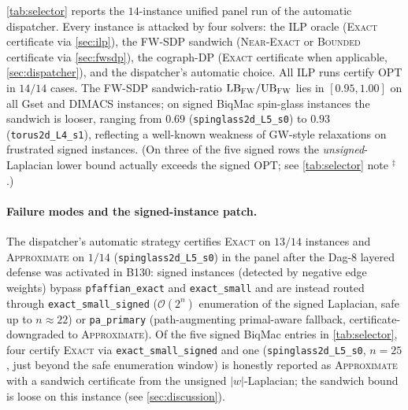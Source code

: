\documentclass{article}
\theoremstyle{definition}
\theoremstyle{remark}
\newcommand{\ILP}{\textsc{ILP}\xspace}
\newcommand{\FW}{\textsc{FW}\xspace}
\newcommand{\SDP}{\textsc{SDP}\xspace}
\newcommand{\GW}{\textsc{GW}\xspace}
\newcommand{\OPT}{\mathrm{OPT}}
\newcommand{\LB}{\mathrm{LB}}
\newcommand{\UB}{\mathrm{UB}}
\newcommand{\Oh}{\mathcal{O}}
\begin{document}
\cref{tab:selector} reports the $14$-instance unified panel run of the
automatic dispatcher. Every instance is attacked by four solvers: the
\ILP oracle (\textsc{Exact} certificate via
\cref{sec:ilp}), the FW-\SDP sandwich (\textsc{Near-Exact} or
\textsc{Bounded} certificate via \cref{sec:fwsdp}), the cograph-DP
(\textsc{Exact} certificate when applicable, \cref{sec:dispatcher}),
and the dispatcher's automatic choice. All \ILP runs certify $\OPT$ in
$14/14$ cases. The FW-\SDP sandwich-ratio $\LB_{\FW} / \UB_{\FW}$ lies in $[0.95, 1.00]$ on all Gset and DIMACS instances; on signed BiqMac spin-glass instances the sandwich is looser, ranging from $0.69$ (\texttt{spinglass2d\_L5\_s0}) to $0.93$ (\texttt{torus2d\_L4\_s1}), reflecting a well-known weakness of \GW-style relaxations on frustrated signed instances. (On three of the five signed rows the \emph{unsigned}-Laplacian lower bound actually exceeds the signed $\OPT$; see \cref{tab:selector} note $^\ddagger$.)

\paragraph{Failure modes and the signed-instance patch.} The dispatcher's
automatic strategy certifies \textsc{Exact} on $13/14$ instances and \textsc{Approximate} on $1/14$ (\texttt{spinglass2d\_L5\_s0}) in the panel
after the Dag-8 layered defense was activated in B130: signed instances
(detected by negative edge weights) bypass \texttt{pfaffian\_exact} and
\texttt{exact\_small} and are instead routed through
\texttt{exact\_small\_signed} ($\Oh(2^n)$ enumeration of the signed
Laplacian, safe up to $n \approx 22$) or \texttt{pa\_primary} (path-augmenting
primal-aware fallback, certificate-downgraded to \textsc{Approximate}).
Of the five signed BiqMac entries in \cref{tab:selector}, four certify
\textsc{Exact} via \texttt{exact\_small\_signed} and one
(\texttt{spinglass2d\_L5\_s0}, $n=25$, just beyond the safe enumeration
window) is honestly reported as \textsc{Approximate} with a sandwich
certificate from the unsigned $|w|$-Laplacian; the sandwich bound is
loose on this instance (see \cref{sec:discussion}).
\end{document}
